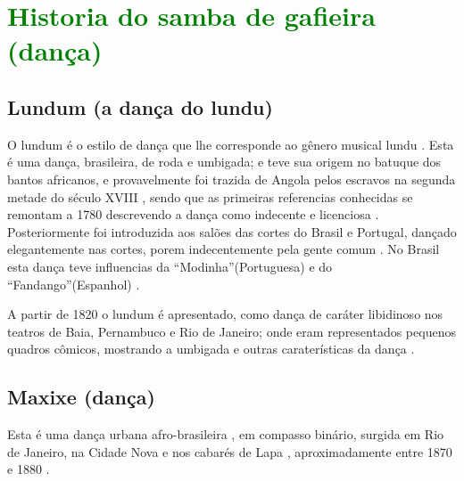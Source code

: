 

\chapter{\textcolor{green}{Historia do samba de gafieira  (dança)}}
\label{cap:sambagafieira}


\section{Lundum (a dança do lundu)} 
\label{sec:lundu}
O lundum é o estilo de dança que lhe corresponde ao gênero musical lundu \cite[pp. 18]{perna2002samba}.
Esta é uma dança, brasileira, de roda e umbigada; e teve sua origem no batuque dos bantos africanos,
e provavelmente foi trazida de Angola pelos escravos na segunda metade do século XVIII \cite[pp. 48]{tinhorao1986pequena} \cite[pp. 188]{dourado2004dicionario},
sendo que as primeiras referencias conhecidas se remontam a 1780 
descrevendo a dança como indecente e licenciosa \cite[pp. 51]{tinhorao1986pequena} \cite[pp. 19]{perna2002samba}.
Posteriormente foi introduzida aos salões das cortes do Brasil e Portugal, 
dançado elegantemente nas cortes, porem indecentemente pela gente comum   \cite[pp. 19]{perna2002samba} \cite[pp. 188]{dourado2004dicionario}.
No Brasil esta dança teve influencias da ``Modinha''(Portuguesa) e do ``Fandango''(Espanhol) \cite[pp. 188]{dourado2004dicionario}.

A partir de 1820 o lundum é apresentado, como dança de caráter libidinoso nos teatros de Baia, Pernambuco e Rio de Janeiro;
onde eram representados pequenos quadros cômicos, 
mostrando a umbigada e outras caraterísticas da dança \cite[pp. 19]{perna2002samba}.


\section{Maxixe (dança)}
\label{sec:maxixe}
Esta é uma dança urbana afro-brasileira \cite[pp. 4]{musicasambavariasdef1}, 
em compasso binário, surgida em Rio de Janeiro, 
na Cidade Nova e nos cabarés de Lapa \cite[pp. 465]{marcondes1977enciclopedia}  \cite[pp. 198]{dourado2004dicionario}, 
aproximadamente entre 1870 e 1880 \cite[pp. 58]{tinhorao1986pequena} \cite[pp. 465]{marcondes1977enciclopedia}  \cite[pp. 62]{reinato2010musica}.

